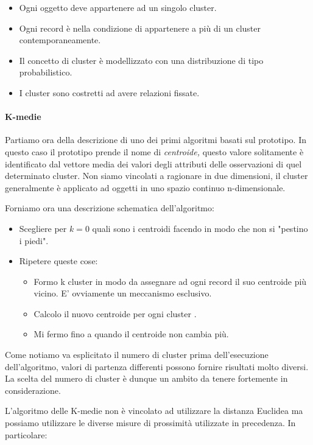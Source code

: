 \begin{itemize}
	\item Ogni oggetto deve appartenere ad un singolo cluster.
	\item Ogni record è nella condizione di appartenere a più di un cluster contemporaneamente.
	\item Il concetto di cluster è modellizzato con una distribuzione di tipo probabilistico.
	\item I cluster sono costretti ad avere relazioni fissate.
\end{itemize}

\paragraph{K-medie}

Partiamo ora della descrizione di uno dei primi algoritmi basati sul prototipo. In questo caso il prototipo prende il nome di \textit{centroide,} questo valore solitamente è identificato dal vettore media dei valori degli attributi delle osservazioni di quel determinato cluster. Non siamo vincolati a ragionare in due dimensioni, il cluster generalmente è applicato ad oggetti in uno spazio continuo n-dimensionale.

Forniamo ora una descrizione schematica dell'algoritmo:
\begin{itemize}
	\item Scegliere per $k = 0$ quali sono i centroidi facendo in modo che non si "pestino i piedi".
	\item Ripetere queste cose:
	\begin{itemize}
		\item Formo k cluster in modo da assegnare ad ogni record il suo centroide più vicino. E' ovviamente un meccanismo esclusivo.
		\item Calcolo il nuovo centroide per ogni cluster .
		\item Mi fermo fino a quando il centroide non cambia più.		 
	\end{itemize}
	
	
\end{itemize}

Come notiamo va esplicitato il numero di cluster prima dell'esecuzione dell'algoritmo,  valori di partenza differenti possono fornire risultati molto diversi. La scelta del numero di cluster è dunque un ambito da tenere fortemente in considerazione.

L'algoritmo delle K-medie non è vincolato ad utilizzare la distanza Euclidea ma possiamo utilizzare le diverse misure di prossimità utilizzate in precedenza. In particolare:

